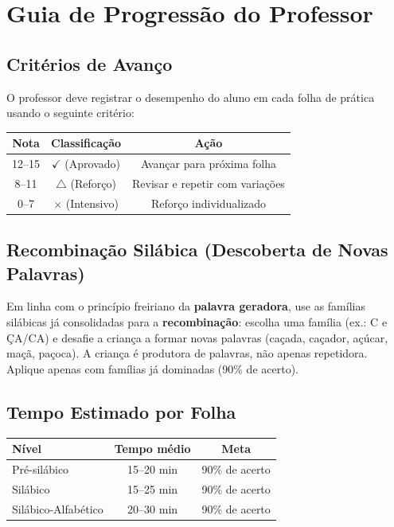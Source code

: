 
\section{Guia de Progressão do Professor}

\subsection{Critérios de Avanço}

O professor deve registrar o desempenho do aluno em cada folha de prática
usando o seguinte critério:

\begin{center}
\begin{tabular}{|c|c|c|}
\hline
\textbf{Nota} & \textbf{Classificação} & \textbf{Ação} \\
\hline
12--15 & $\checkmark$ (Aprovado) & Avançar para próxima folha \\
8--11 & $\triangle$ (Reforço) & Revisar e repetir com variações \\
0--7 & $\times$ (Intensivo) & Reforço individualizado \\
\hline
\end{tabular}
\end{center}

\subsection{Recombina\c{c}\~ao Sil\'abica (Descoberta de Novas Palavras)}

Em linha com o princ\'ipio freiriano da \textbf{palavra geradora}, use as
fam\'ilias sil\'abicas j\'a consolidadas para a \textbf{recombina\c{c}\~ao}:
escolha uma fam\'ilia (ex.: C e \c{C}A/CA) e desafie a crian\c{c}a a formar novas
palavras (ca\c{c}ada, ca\c{c}ador, a\c{c}\'ucar, ma\c{c}\~a, pa\c{c}oca).
A crian\c{c}a \'e produtora de palavras, n\~ao apenas repetidora. Aplique apenas
com fam\'ilias j\'a dominadas (90\% de acerto).

\subsection{Tempo Estimado por Folha}

\begin{center}
\begin{tabular}{|l|c|c|}
\hline
\textbf{Nível} & \textbf{Tempo médio} & \textbf{Meta} \\
\hline
Pré-silábico & 15--20 min & 90\% de acerto \\
Silábico & 15--25 min & 90\% de acerto \\
Silábico-Alfabético & 20--30 min & 90\% de acerto \\
\hline
\end{tabular}
\end{center}

